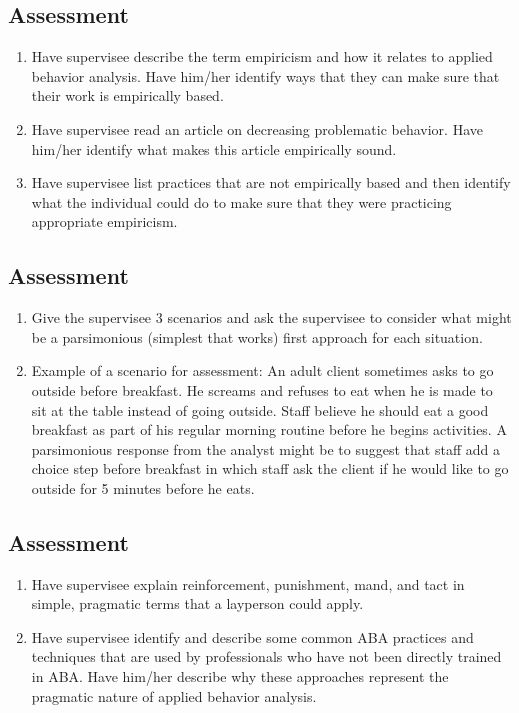 \subsection{Assessment}
\begin{enumerate}
\item Have supervisee describe the term empiricism and how it relates to applied behavior analysis. Have him/her identify ways that they can make sure that their work is empirically based. 
\item Have supervisee read an article on decreasing problematic behavior. Have him/her identify what makes this article empirically sound. 
\item Have supervisee list practices that are not empirically based and then identify what the individual could do to make sure that they were practicing appropriate empiricism. 
\end{enumerate}
%
\subsection{Assessment}
\begin{enumerate}
\item Give the supervisee 3 scenarios and ask the supervisee to consider what might be a parsimonious (simplest that works) first approach for each situation.
\item Example of a scenario for assessment: An adult client sometimes asks to go outside before breakfast. He screams and refuses to eat when he is made to sit at the table instead of going outside. Staff believe he should eat a good breakfast as part of his regular morning routine before he begins activities. A parsimonious response from the analyst might be to suggest that staff add a choice step before breakfast in which staff ask the client if he would like to go outside for 5 minutes before he eats. 
%
\end{enumerate}
%
\subsection{Assessment}
\begin{enumerate}
\item Have supervisee explain reinforcement, punishment, mand, and tact in simple, pragmatic terms that a layperson could apply. 
\item Have supervisee identify and describe some common ABA practices and techniques that are used by professionals who have not been directly trained in ABA. Have him/her describe why these approaches represent the pragmatic nature of applied behavior analysis.  
%
\end{enumerate}
%
